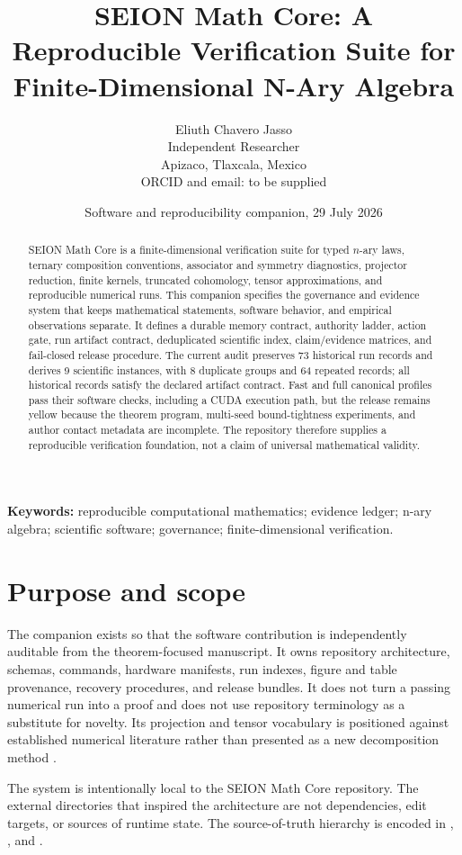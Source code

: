 \documentclass[11pt]{article}
\title{SEION Math Core: A Reproducible Verification Suite for Finite-Dimensional N-Ary Algebra}
\author{Eliuth Chavero Jasso\\
\small Independent Researcher\\
\small Apizaco, Tlaxcala, Mexico\\
\small ORCID and email: to be supplied}
\date{Software and reproducibility companion, 29 July 2026}
\begin{document}
\maketitle

\begin{abstract}
SEION Math Core is a finite-dimensional verification suite for typed $n$-ary laws, ternary composition conventions, associator and symmetry diagnostics, projector reduction, finite kernels, truncated cohomology, tensor approximations, and reproducible numerical runs. This companion specifies the governance and evidence system that keeps mathematical statements, software behavior, and empirical observations separate. It defines a durable memory contract, authority ladder, action gate, run artifact contract, deduplicated scientific index, claim/evidence matrices, and fail-closed release procedure. The current audit preserves 73 historical run records and derives 9 scientific instances, with 8 duplicate groups and 64 repeated records; all historical records satisfy the declared artifact contract. Fast and full canonical profiles pass their software checks, including a CUDA execution path, but the release remains yellow because the theorem program, multi-seed bound-tightness experiments, and author contact metadata are incomplete. The repository therefore supplies a reproducible verification foundation, not a claim of universal mathematical validity.
\end{abstract}

\noindent\textbf{Keywords:} reproducible computational mathematics; evidence ledger; n-ary algebra; scientific software; governance; finite-dimensional verification.

\section{Purpose and scope}

The companion exists so that the software contribution is independently auditable from the theorem-focused manuscript. It owns repository architecture, schemas, commands, hardware manifests, run indexes, figure and table provenance, recovery procedures, and release bundles. It does not turn a passing numerical run into a proof and does not use repository terminology as a substitute for novelty. Its projection and tensor vocabulary is positioned against established numerical literature rather than presented as a new decomposition method \cite{KoldaBader2009,BennerGugercinWillcox2015}.

The system is intentionally local to the SEION Math Core repository. The external directories that inspired the architecture are not dependencies, edit targets, or sources of runtime state. The source-of-truth hierarchy is encoded in , , and .
\end{document}
